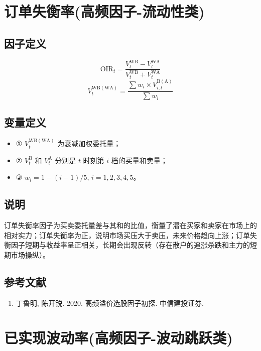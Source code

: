 \documentclass{article}
\begin{document}
\section{订单失衡率(高频因子-流动性类)}

\subsection{因子定义}
\begin{equation}
    \mathrm{OIR}_t = \frac{V_t^{\mathrm{WB}} - V_t^{\mathrm{WA}}}{V_t^{\mathrm{WB}} + V_t^{\mathrm{WA}}}
\end{equation}
\begin{equation}
    V_t^{\mathrm{WB(WA)}} = \frac{\sum w_i \times V_{i,t}^{\mathrm{B(A)}}}{\sum w_i}
\end{equation}

\subsection{变量定义}
\begin{itemize}
    \item ① \( V_t^{\mathrm{WB(WA)}} \) 为衰减加权委托量；
    \item ② \( V_{t}^{\mathrm{B}} \) 和 \( V_{t}^{\mathrm{A}} \) 分别是 \( t \) 时刻第 \( i \) 档的买量和卖量；
    \item ③ \( w_i = 1 - (i-1)/5, \, i = 1, 2, 3, 4, 5 \)。
\end{itemize}

\subsection{说明}
订单失衡率因子为买卖委托量差与其和的比值，衡量了潜在买家和卖家在市场上的相对实力；订单失衡率为正，说明市场买压大于卖压，未来价格趋向上涨；订单失衡因子短期与收益率呈正相关，长期会出现反转（存在散户的追涨杀跌和主力的短期市场操纵）。

\subsection{参考文献}
\begin{enumerate}
    \item 丁鲁明, 陈开锐. 2020. 高频溢价选股因子初探. 中信建投证券.
\end{enumerate}

\section{已实现波动率(高频因子-波动跳跃类)}
\end{document}
